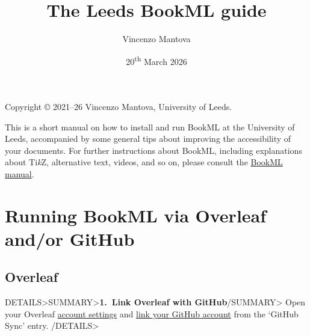 \documentclass[a4paper,british]{article}
\title{The Leeds BookML guide}
\author{Vincenzo Mantova}
\date{20\textsuperscript{th} March 2026}
\newenvironment{foldedframe}[1][]{%
    \<DETAILS>\<SUMMARY>\textbf{#1}\</SUMMARY>}%
  {\</DETAILS>}
\newenvironment{foldedframe}[1][]{\bgroup\colorlet{TFFrameColor}{SpringGreen}
  \colorlet{TFTitleColor}{black}\begin{titled-frame}{#1}}{\end{titled-frame}\egroup}
\newcommand\tikzname{Ti\emph{k}Z}
\begin{document}
\begin{lxFooter}
  Copyright \copyright{} 2021--26 Vincenzo Mantova, University of Leeds.
\end{lxFooter}
\fancyfoot[C]{}
\fancyfoot[R]{\thepage}
\pagestyle{fancy}

\maketitle

This is a short manual on how to install and run BookML at the University of Leeds, accompanied by some general tips about improving the accessibility of your documents. For further instructions about BookML, including explanations about \tikzname, alternative text, videos, and so on, please consult the \href{https://vlmantova.github.io/bookml/}{BookML manual}.

\tableofcontents

\section{Running BookML via Overleaf and/or GitHub}\label{running-bookml-via-overleaf-and-or-github}

\subsection{Overleaf}\label{overleaf}

\begin{foldedframe}[1.\ Link Overleaf with GitHub]
  Open your Overleaf \href{https://www.overleaf.com/user/settings}{account settings} and \href{https://docs.overleaf.com/integrations-and-add-ons/git-integration-and-github-synchronization/github-synchronization#linking-your-overleaf-account-to-your-github-account}{link your GitHub account} from the `GitHub Sync' entry.
\end{foldedframe}
\end{document}
